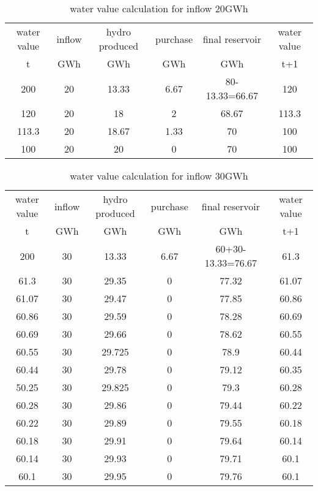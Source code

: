 \documentclass{article}
\begin{document}
\begin{table}
\begin{center}
\begin{tabular}{|c|c|c|c|c|c|}
\hline
water value & inflow & hydro produced & purchase & final reservoir	& water value\\
    t       &  GWh   &    GWh         &     GWh       &     GWh         & t+1 \\
\hline
\hline
200 & 20 & 13.33 & 6.67 & 80-13.33=66.67 & 120\\
120 & 20 & 18 & 2 & 68.67 & 113.3\\
113.3 & 20 & 18.67 & 1.33 & 70 & 100\\
\hline
100 & 20 & 20 & 0 & 70 & 100\\
\hline
\end{tabular}
\caption{water value calculation for inflow 20GWh}
\label{tab:20}
\end{center}
\end{table}

\begin{table}
\begin{center}
\begin{tabular}{|c|c|c|c|c|c|}
\hline
water value & inflow & hydro produced & purchase & final reservoir	& water value\\
    t       &  GWh   &    GWh         &     GWh       &     GWh         & t+1 \\
\hline
\hline
200 & 30 & 13.33 & 6.67 & 60+30-13.33=76.67 & 61.3\\
61.3 & 30 & 29.35 & 0 & 77.32 & 61.07\\
61.07 & 30 & 29.47 & 0 & 77.85 & 60.86\\
60.86 & 30 & 29.59 & 0 & 78.28 & 60.69\\
60.69 & 30 & 29.66 & 0 & 78.62 & 60.55\\
60.55 & 30 & 29.725 & 0 & 78.9 & 60.44\\
60.44 & 30 & 29.78 & 0 & 79.12 & 60.35\\
50.25 & 30 & 29.825 & 0 & 79.3 & 60.28\\
60.28 & 30 & 29.86 & 0 & 79.44 & 60.22\\
60.22 & 30 & 29.89 & 0 & 79.55 & 60.18\\
60.18 & 30 & 29.91 & 0 & 79.64 & 60.14\\
60.14 & 30 & 29.93 & 0 & 79.71 & 60.1\\
\hline
60.1 & 30 & 29.95 & 0 & 79.76 & 60.1\\
\hline
\end{tabular}
\caption{water value calculation for inflow 30GWh}
\label{tab:30}
\end{center}
\end{table}
\end{document}
